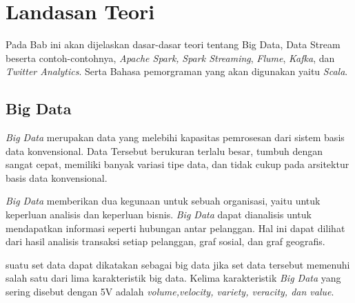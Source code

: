 \chapter{Landasan Teori}
\label{chap:teori}

Pada Bab ini akan dijelaskan dasar-dasar teori tentang Big Data, Data Stream beserta contoh-contohnya, \textit{Apache Spark,} \textit{Spark Streaming}, \textit{Flume}, \textit{Kafka}, dan \textit{Twitter Analytics}. Serta Bahasa pemorgraman yang akan digunakan yaitu\textit{ Scala}.

\section{Big Data}
\textit{Big Data} merupakan data yang melebihi kapasitas pemrosesan dari sistem basis data konvensional. Data Tersebut berukuran terlalu besar, tumbuh dengan sangat cepat, memiliki banyak variasi tipe data, dan tidak cukup pada arsitektur basis data konvensional.

\textit{Big Data} memberikan dua kegunaan untuk sebuah organisasi, yaitu untuk keperluan analisis dan keperluan bisnis. \textit{Big Data} dapat dianalisis untuk mendapatkan informasi seperti hubungan antar pelanggan. Hal ini dapat dilihat dari hasil analisis transaksi setiap pelanggan, graf sosial, dan graf geografis.

suatu set data dapat dikatakan sebagai big data jika set data tersebut memenuhi salah satu dari lima karakteristik big data. Kelima karakteristik \textit{Big Data} yang sering disebut dengan 5V adalah \textit{volume,velocity, variety, veracity, dan value}.

